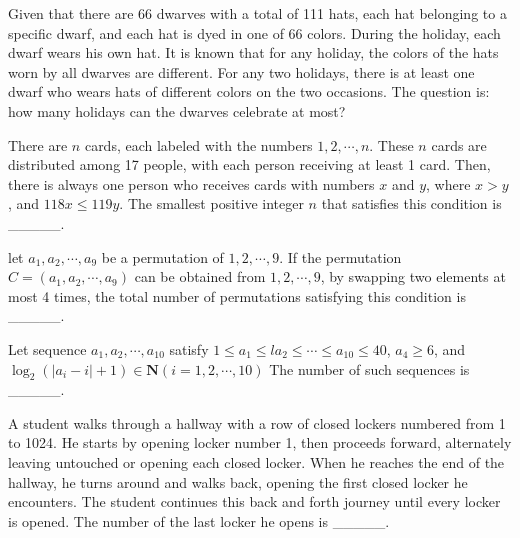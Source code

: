 \begin{problem}\label{Combinary-26}
Given that there are 66 dwarves with a total of 111 hats, each hat belonging to a specific dwarf, and each hat is dyed in one of 66 colors. During the holiday, each dwarf wears his own hat. It is known that for any holiday, the colors of the hats worn by all dwarves are different. For any two holidays, there is at least one dwarf who wears hats of different colors on the two occasions. The question is: how many holidays can the dwarves celebrate at most? 
\end{problem}

\begin{problem}\label{Combinary-27}
There are $n$ cards, each labeled with the numbers $1 , 2, \cdots, n$. These $n$ cards are distributed among 17 people, with each person receiving at least 1 card. Then, there is always one person who receives cards with numbers $x$ and $y$, where $x>y$, and  $118x \leqslant 119y$. The smallest positive integer $n$ that satisfies this condition is \_\_\_\_\_.
\end{problem}

\begin{problem}\label{Combinary-28}
let $a_{1}, a_{2}, \cdots, a_{9}$ be a permutation of $1,2, \cdots, 9$. If the permutation $C=\left(a_{1}, a_{2}, \cdots, a_{9}\right)$ can be obtained from $1,2, \cdots, 9$, by swapping two elements at most 4 times, the total number of permutations satisfying this condition is \_\_\_\_\_.
\end{problem}

\begin{problem}\label{Combinary-29}
Let sequence $a_{1}, a_{2}, \cdots, a_{10}$ satisfy $1 \leqslant a_{1} \leqslant{l} a_{2} \leqslant \cdots \leqslant a_{10} \leqslant 40$, $a_{4} \geqslant6$, and $\log _{2}\left(\left|a_{i}-i\right|+1\right) \in \mathbf{N}(i=1,2, \cdots, 10)$ The number of such sequences is \_\_\_\_\_. 
\end{problem}

\begin{problem}\label{Combinary-30}
A student walks through a hallway with a row of closed lockers numbered from 1 to 1024. He starts by opening locker number 1, then proceeds forward, alternately leaving untouched or opening each closed locker. When he reaches the end of the hallway, he turns around and walks back, opening the first closed locker he encounters. The student continues this back and forth journey until every locker is opened. The number of the last locker he opens is \_\_\_\_\_.
\end{problem}


